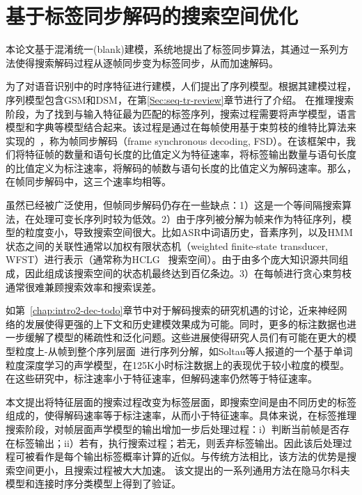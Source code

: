 
\chapter{基于标签同步解码的搜索空间优化}
\label{chap:lsd}

本论文基于混淆统一(blank)建模，系统地提出了标签同步算法，其通过一系列方法使得搜索解码过程从逐帧同步变为标签同步，从而加速解码。

为了对语音识别中的时序特征进行建模，人们提出了序列模型。根据其建模过程，序列模型包含GSM和DSM，在第\ref{Sec:seq-tr-review}章节进行了介绍。
在推理搜索阶段，为了找到与输入特征最为匹配的标签序列，搜索过程需要将声学模型，语言模型和字典等模型结合起来。该过程是通过在每帧使用基于束剪枝的维特比算法来实现的~\cite{forney1973viterbi}，称为帧同步解码（frame synchronous decoding, FSD）。在该框架中，我们将特征帧的数量和语句长度的比值定义为特征速率，将标签输出数量与语句长度的比值定义为标注速率，将解码的帧数与语句长度的比值定义为解码速率。那么，在帧同步解码中，这三个速率均相等。

虽然已经被广泛使用，但帧同步解码仍存在一些缺点：1）这是一个等间隔搜索算法，在处理可变长序列时较为低效。2）由于序列被分解为帧来作为特征序列，模型的粒度变小，导致搜索空间很大。比如ASR中词语历史，音素序列，以及HMM状态之间的关联性通常以加权有限状态机（weighted finite-state transducer, WFST）进行表示（通常称为HCLG~\cite{mohri2002weighted} 搜索空间）。由于由多个庞大知识源共同组成，因此组成该搜索空间的状态机最终达到百亿条边。3）在每帧进行贪心束剪枝通常很难兼顾搜索效率和搜索误差。

如第~\ref{chap:intro2-dec-todo}章节中对于解码搜索的研究机遇的讨论，近来神经网络的发展使得更强的上下文和历史建模效果成为可能\cite{sak2014long,qian2016very}。同时，更多的标注数据也进一步缓解了模型的稀疏性和泛化问题。这些进展使得研究人员们有可能在更大的模型粒度上-从帧到整个序列层面~\cite{amodei2015deep,soltau2016neural,collobert2016wav2letter,sak2015fast,chan2016end}进行序列分解，如Soltau等人报道的一个基于单词粒度深度学习的声学模型\cite{soltau2016neural}，在125K小时标注数据上的表现优于较小粒度的模型。在这些研究中，标注速率小于特征速率，但解码速率仍然等于特征速率。

本文提出将特征层面的搜索过程改变为标签层面，即搜索空间是由不同历史的标签组成的，使得解码速率等于标注速率，从而小于特征速率。具体来说，在标签推理搜索阶段，对帧层面声学模型的输出增加一步后处理过程：i）判断当前帧是否存在标签输出；ii）若有，执行搜索过程；若无，则丢弃标签输出。因此该后处理过程可被看作是每个输出标签概率计算的近似。与传统方法相比，该方法的优势是搜索空间更小，且搜索过程被大大加速。
该文提出的一系列通用方法在隐马尔科夫模型和连接时序分类模型上得到了验证。

